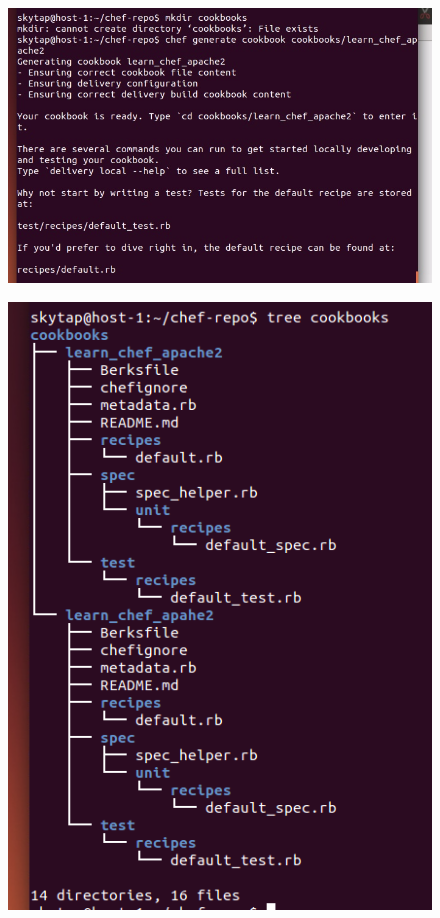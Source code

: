 \documentclass[12pt,letterpaper,boxed]{hmcpset}
\begin{document}
\begin{figure}[H]
  \centering
  \includegraphics[width = 1.0\textwidth]{26.png}
\end{figure}
\begin{figure}[H]
  \centering
  \includegraphics[width = 1.0\textwidth]{27.png}
\end{figure}
\end{document}
